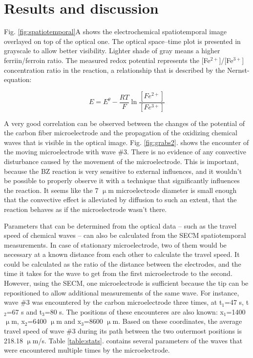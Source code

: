\documentclass[3p, twocolumn]{elsarticle}
\begin{document}
\section{Results and discussion}

Fig. \ref{fig:spatiotemporal}A shows the electrochemical spatiotemporal image overlayed on top of the optical one.
The optical space--time plot is presented in grayscale to allow better visibility.
Lighter shade of gray means a higher ferriin/ferroin  ratio.
The measured redox potential represents the [Fe$^{2+}$]/[Fe$^{3+}$]  concentration ratio in the reaction, a relationship that is described by the Nernst-equation:

\begin{equation}
	E = E^\theta - \frac{RT}{F}\ln \frac{[Fe^{2+}]}{[Fe^{3+}]}
\end{equation}

A very good correlation can be observed between the changes of the potential of the carbon fiber microelectrode and the propagation of the oxidizing chemical waves that is visible in the optical image.
Fig. \ref{fig:grabs2}. shows the encounter of the moving microelectrode with wave \#3.
There is no evidence of any convective disturbance caused by the movement of the microelectrode.
This is important, because the BZ reaction is very sensitive to external influences, and it wouldn't be possible to properly observe it with a technique that significantly influences the reaction.
It seems like the 7 $\upmu$m microelectrode diameter is small enough that the convective effect is alleviated by diffusion to such an extent, that the reaction behaves as if the microelectrode wasn't there.

Parameters that can be determined from the optical data -- such as the travel speed of chemical waves -- can also be calculated from the SECM spatiotemporal measurements.
In case of stationary microelectrode, two of them would be necessary at a known distance from each other to calculate the travel speed.
It could be calculated as the ratio of the distance between the electrodes, and the time it takes for the wave to get from the first microelectrode to the second.
However, using the SECM, one microelectrode is sufficient because the tip can be repositioned to allow additional measurements of the same wave.
For instance, wave \#3 was encountered by the carbon microelectrode three times, at t$_1$=47 s, t$_2$=67 s and t$_3$=80 s.
The positions of these encounteres are also known: x$_1$=1400 $\upmu$m, x$_2$=6400 $\upmu$m and x$_3$=8600 $\upmu$m.
Based on these coordinates, the average travel speed of wave \#3 during its path between the two outermost positions is 218.18 $\upmu$m/s.
Table \ref{table:stats}. contains several parameters of the waves that were encountered multiple times by the microelectrode. 
\end{document}
